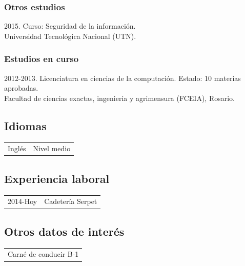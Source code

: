 \documentclass[10pt]{article}
\begin{document}
\subsubsection*{Otros estudios}
\normalsize{2015. Curso: Seguridad de la información.}\\\small{Universidad Tecnológica Nacional (UTN).}
\subsubsection*{Estudios en curso}
\normalsize{2012-2013. Licenciatura en ciencias de la computación. Estado: 10 materias aprobadas.}\\
\small{Facultad de ciencias exactas, ingenieria y agrimensura (FCEIA), Rosario.}
\subsection*{Idiomas}
\begin{tabular}{l l}
  Inglés&Nivel medio\\
\end{tabular}
\subsection*{Experiencia laboral}
\begin{tabular}{l l}
  2014-Hoy&Cadetería Serpet\\
\end{tabular}
\subsection*{Otros datos de interés}
\begin{tabular}{l}
  Carné de conducir B-1\\
\end{tabular}
\end{document}
